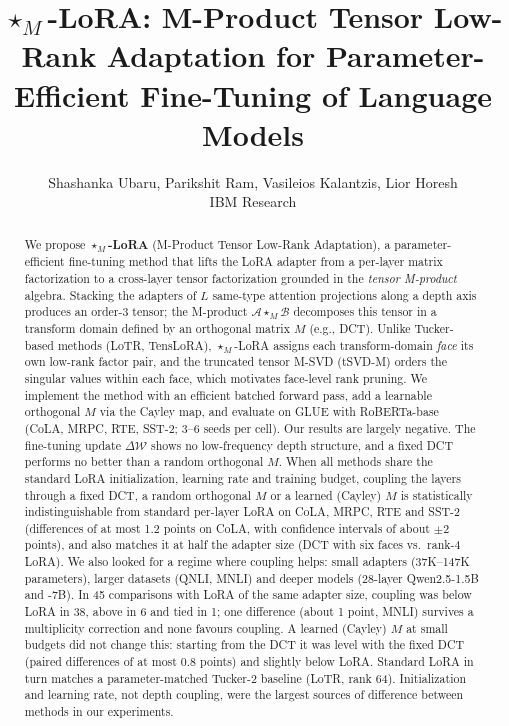 \documentclass{article}
\title{$\star_M$-LoRA: M-Product Tensor Low-Rank Adaptation
for Parameter-Efficient Fine-Tuning of Language Models}
\author{Shashanka Ubaru, Parikshit Ram, Vasileios Kalantzis, Lior Horesh\\
IBM Research}
\newcommand{\cA}{\mathcal{A}}
\newcommand{\cB}{\mathcal{B}}
\newcommand{\mprod}{\star_M}
\newcommand{\DeltaW}{\Delta\mathcal{W}}
\theoremstyle{plain}
\begin{document}
\maketitle
{}

\begin{abstract}
We propose \textbf{$\star_M$-LoRA} (M-Product Tensor Low-Rank Adaptation), a parameter-efficient
fine-tuning method that lifts the LoRA adapter from a per-layer matrix factorization to a
cross-layer tensor factorization grounded in the \emph{tensor M-product} algebra.
Stacking the adapters of $L$ same-type attention projections along a depth axis
produces an order-3 tensor; the M-product $\cA \mprod \cB$ decomposes this tensor
in a transform domain defined by an orthogonal matrix $M$ (e.g., DCT).
Unlike Tucker-based methods (LoTR, TensLoRA), $\star_M$-LoRA assigns each transform-domain
\emph{face} its own low-rank factor pair, and the truncated tensor M-SVD (tSVD-M) orders the singular
values within each face, which motivates face-level rank pruning.
We implement the method with an efficient batched forward pass, add a learnable orthogonal $M$ via the Cayley map,
and evaluate on GLUE with RoBERTa-base (CoLA, MRPC, RTE, SST-2; 3--6 seeds per cell).
Our results are largely negative.
The fine-tuning update $\DeltaW$ shows no low-frequency depth structure, and a fixed DCT performs no better than a random orthogonal $M$.
When all methods share the standard LoRA initialization, learning rate and training budget, coupling the layers through a fixed DCT, a random orthogonal $M$ or a
learned (Cayley) $M$ is statistically indistinguishable from standard per-layer LoRA on CoLA, MRPC, RTE and SST-2 (differences of at most 1.2 points on CoLA, with confidence intervals of about $\pm2$ points),
and also matches it at half the adapter size (DCT with six faces vs.\ rank-4 LoRA).
We also looked for a regime where coupling helps: small adapters (37K--147K parameters), larger datasets (QNLI, MNLI) and deeper models (28-layer Qwen2.5-1.5B and -7B).
In 45 comparisons with LoRA of the same adapter size, coupling was below LoRA in 38, above in 6 and tied in 1; one difference (about 1 point, MNLI) survives a multiplicity correction and none favours coupling.
A learned (Cayley) $M$ at small budgets did not change this: starting from the DCT it was level with the fixed DCT (paired differences of at most 0.8 points) and slightly below LoRA.
Standard LoRA in turn matches a parameter-matched Tucker-2 baseline (LoTR, rank 64).
Initialization and learning rate, not depth coupling, were the largest sources of difference between methods in our experiments.
\end{abstract}
\end{document}
